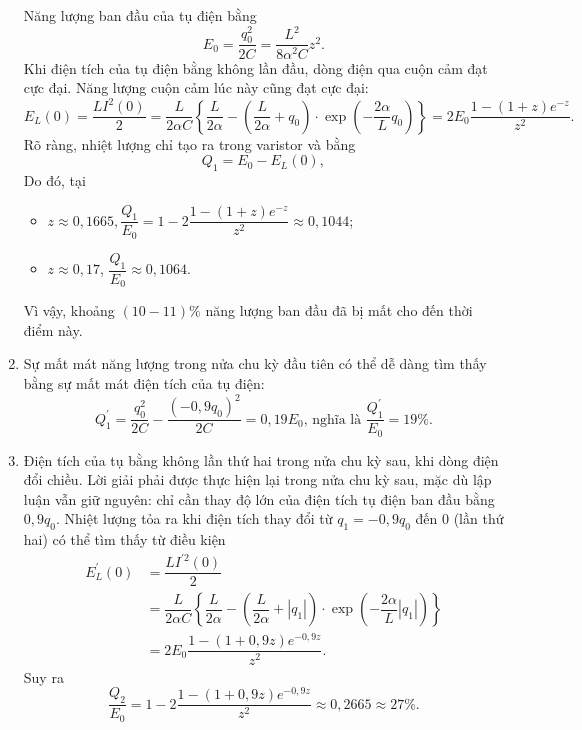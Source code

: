 \begin{loigiai}
\begin{enumerate}[1)]
    Năng lượng ban đầu của tụ điện bằng
    \[E_{0}=\dfrac{q_{0}^{2}}{2 C}=\dfrac{L^{2}}{8 \alpha^{2} C} z^{2}.\]
    Khi điện tích của tụ điện bằng không lần đầu, dòng điện qua cuộn cảm đạt cực đại. Năng lượng cuộn cảm lúc này cũng đạt cực đại:
    \[E_{L}(0) = \dfrac{LI^{2}(0)}{2} = \dfrac{L}{2 \alpha C}\left\{\dfrac{L}{2 \alpha}-\left(\dfrac{L}{2 \alpha}+q_{0}\right) \cdot \exp \left(-\dfrac{2 \alpha}{L} q_{0}\right)\right\}=2 E_{0} \dfrac{1-(1+z) e^{-z}}{z^{2}}.\]
    Rõ ràng, nhiệt lượng chỉ tạo ra trong varistor và bằng
    \[Q_{1}=E_{0}-E_{L}(0),\]
    Do đó, tại 
    \begin{itemize}
        \item $z \approx 0,1665, \dfrac{Q_{1}}{E_{0}} = 1-2 \dfrac{1-(1+z) e^{-z}}{z^{2}} \approx 0,1044$;
        \item $z \approx 0,17$, $\dfrac{Q_{1}}{E_{0}} \approx 0,1064$.
    \end{itemize}
    Vì vậy, khoảng $(10 - 11)\%$ năng lượng ban đầu đã bị mất cho đến thời điểm này.
    \item Sự mất mát năng lượng trong nửa chu kỳ đầu tiên có thể dễ dàng tìm thấy bằng sự mất mát điện tích của tụ điện:
    \[Q_{1}^{\prime}=\dfrac{q_{0}^{2}}{2 C}-\dfrac{\left(-0,9 q_{0}\right)^{2}}{2 C} = 0,19 E_{0} \text {, nghĩa là } \dfrac{Q_{1}^{\prime}}{E_{0}} = 19 \%.\]
    \item Điện tích của tụ bằng không lần thứ hai trong nửa chu kỳ sau, khi dòng điện đổi chiều. Lời giải phải được thực hiện lại trong nửa chu kỳ sau, mặc dù lập luận vẫn giữ nguyên: chỉ cần thay độ lớn của điện tích tụ điện ban đầu bằng $0,9q_0$. Nhiệt lượng tỏa ra khi điện tích thay đổi từ $q_{1}=-0,9 q_{0}$ đến $0$ (lần thứ hai) có thể tìm thấy từ điều kiện
    \[\begin{aligned}
        E_{L}^{\prime}(0) &= \dfrac{L I^{\prime 2}(0)}{2} \\
        &= \dfrac{L}{2 \alpha C}\left\{\dfrac{L}{2 \alpha}-\left(\dfrac{L}{2 \alpha}+\left|q_{1}\right|\right) \cdot \exp \left(-\dfrac{2 \alpha}{L}\left|q_{1}\right|\right)\right\}\\
        &= 2 E_{0} \dfrac{1-(1+0,9 z) e^{-0,9 z}}{z^{2}}.
    \end{aligned}\]
    Suy ra
    \[\dfrac{Q_{2}}{E_{0}}=1-2 \dfrac{1-(1+0,9 z) e^{-0,9 z}}{z^{2}} \approx 0,2665 \approx 27 \%.\]
\end{enumerate}
\end{loigiai}


